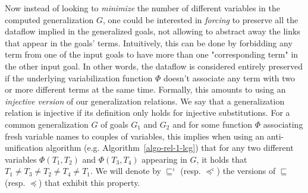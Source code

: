 %	
Now instead of looking to \textit{minimize} the number of different variables in the computed generalization $G$, one could be interested in \textit{forcing} to preserve all the dataflow implied in the generalized goals, not allowing to abstract away the links that appear in the goals' terms. Intuitively, this can be done by forbidding any term from one of the input goals to have more than one "corresponding term" in the other input goal. In other words, the dataflow is considered entirely preserved if the underlying variabilization function $\Phi$ doesn't associate any term with two or more different terms at the same time. Formally, this amounts to using an \textit{injective version} of our generalization relations. We say that a generalization relation is injective if its definition only holds for injective substitutions. For a common generalization $G$ of goals $G_1$ and $G_2$ and for some function $\Phi$ associating fresh variable names to couples of variables, this implies when using an anti-unification algorithm (e.g. Algorithm~\ref{algo-rel-1-lcg}) that for any two different variables $\Phi(T_1, T_2)$ and $\Phi(T_3, T_4)$ appearing in $G$, it holds that $T_1 \neq T_3 \neq T_2 \neq T_4\neq T_1$. We will denote by $\sqsubseteq^\iota$ (resp. $\preceq^\iota$) the versions of $\sqsubseteq$ (resp. $\preceq$) that exhibit this property.

